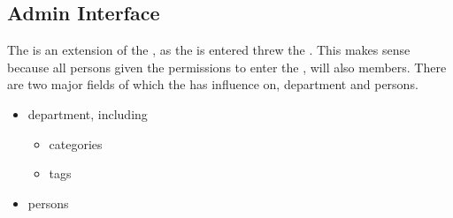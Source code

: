 \subsection{Admin Interface}
\label{sec:admininterface}

The \ainterface[] is an extension of the \sinterface[], as the \ainterface[] is entered threw the \sinterface[]. This makes sense because all persons given the permissions to enter the \ainterface[], will also \astaff[] members. There are two major fields of which the \admin[] has influence on, department and persons.

\begin{itemize}
	\item department, including
	\begin{itemize}
		\item categories
		\item tags
	\end{itemize}
	\item persons
\end{itemize}